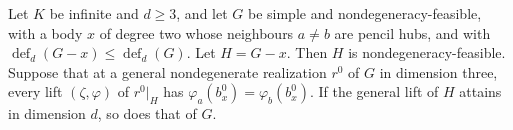 \begin{lemma}
  \label{lem:pencil-d-lift-ear}
  \leanok
  Let $K$ be infinite and $d \ge 3$, and let $G$ be simple and
  nondegeneracy-feasible, with a body $x$ of degree two whose neighbours
  $a \ne b$ are pencil hubs, and with
  $\operatorname{def}_d(G - x) \le \operatorname{def}_d(G)$. Let
  $H = G - x$. Then $H$ is nondegeneracy-feasible. Suppose that at a
  general nondegenerate realization $r^0$ of $G$ in dimension three, every
  lift $(\zeta, \varphi)$ of $r^0|_H$ has
  $\varphi_a(b^0_x) = \varphi_b(b^0_x)$. If the general lift of $H$
  attains in dimension $d$, so does that of $G$.
\end{lemma}
